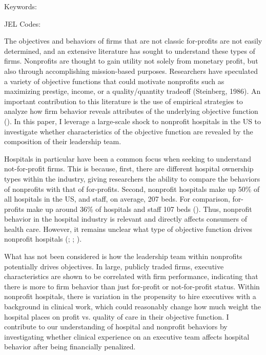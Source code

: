 \documentclass[12pt]{article}
\begin{document}
	
	
	
	\vspace{0.8in}
	
	\noindent Keywords: 
	
	\noindent JEL Codes: 
	
	\onehalfspacing
	
	\newpage

  The objectives and behaviors of firms that are not classic for-profits are not easily determined, and an extensive literature has sought to understand these types of firms. Nonprofits are thought to gain utility not solely from monetary profit, but also through accomplishing mission-based purposes. Researchers have speculated a variety of objective functions that could motivate nonprofits such as maximizing prestige, income, or a quality/quantity tradeoff (Steinberg, 1986). An important contribution to this literature is the use of empirical strategies to analyze how firm behavior reveals attributes of the underlying objective function (\cite{sloan2000not}). In this paper, I leverage a large-scale shock to nonprofit hospitals in the US to investigate whether characteristics of the objective function are revealed by the composition of their leadership team.
  
  Hospitals in particular have been a common focus when seeking to understand not-for-profit firms. This is because, first, there are different hospital ownership types within the industry, giving researchers the ability to compare the behaviors of nonprofits with that of for-profits. Second, nonprofit hospitals make up 50\% of all hospitals in the US, and staff, on average, 207 beds. For comparison, for-profits make up around 36\% of hospitals and staff 107 beds (\cite{ASPE_2023}). Thus, nonprofit behavior in the hospital industry is relevant and directly affects consumers of health care. However, it remains unclear what type of objective function drives nonprofit hospitals (\cite{erus2002inferring}; \cite{deneffe2002not}; \cite{horwitz2009hospital}). 
  
  What has not been considered is how the leadership team within nonprofits potentially drives objectives. In large, publicly traded firms, executive characteristics are shown to be correlated with firm performance, indicating that there is more to firm behavior than just for-profit or not-for-profit status. Within nonprofit hospitals, there is variation in the propensity to hire executives with a background in clinical work, which could reasonably change how much weight the hospital places on profit vs. quality of care in their objective function. I contribute to our understanding of hospital and nonprofit behaviors by investigating whether clinical experience on an executive team affects hospital behavior after being financially penalized.
\end{document}
